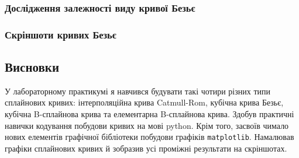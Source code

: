 \documentclass[a4paper,14pt]{extarticle} %
\begin{document}
\subsubsection*{Дослідження залежності виду кривої Безьє}


\subsubsection*{Скріншоти кривих Безьє}

\begin{figure}[h]
\end{figure}

\subsection*{Висновки}

У лабораторному практикумі я навчився будувати такі чотири різних типи сплайнових кривих: інтерполяційна крива 
Catmull-Rom, кубічна крива Безьє, кубічна B-сплайнова крива та елементарна B-сплайнова крива. Здобув практичні 
навички кодування побудови кривих на мові python. Крім того, засвоїв чимало нових елементів графічної бібліотеки 
побудови графіків \texttt{matplotlib}. Намалював графіки сплайнових кривих й зобразив усі проміжні результати на скріншотах.
\end{document}
